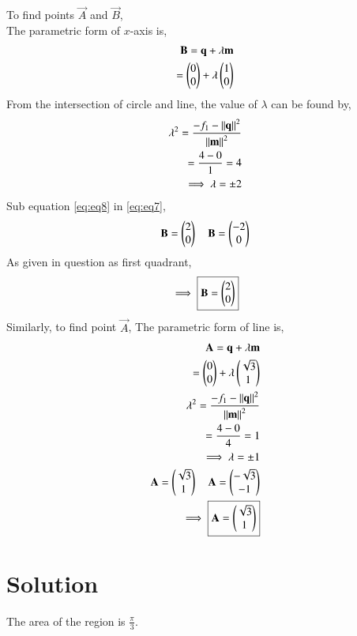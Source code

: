 \documentclass[journal,12pt,twocolumn]{IEEEtran}
\begin{document}
To find points $\vec{A}$ and $\vec{B}$,\\
The parametric form of $x$-axis is,
\begin{align}
    \mathbf{B} = \mathbf{q}+\lambda\mathbf{m}\\
=\begin{pmatrix}0\\0\end{pmatrix}+\lambda\begin{pmatrix}1\\0\end{pmatrix} \label{eq:eq7}
\end{align}
From the intersection of circle and line, the value of $\lambda$ can be found by,
\begin{align}
    \lambda^2 = \frac{-f_1-\left\lVert\mathbf{q}\right\rVert^2}{\left\lVert\mathbf{m}\right\rVert^2}\\
                = \frac{4-0}{1} = 4\\
    \implies \lambda = \pm{2} \label{eq:eq8}
\end{align}
Sub equation \eqref{eq:eq8} in \eqref{eq:eq7},
\begin{align}
    \mathbf{B} = \begin{pmatrix}2\\0\end{pmatrix}\quad \mathbf{B} = \begin{pmatrix}-2\\0\end{pmatrix} \label{eq:eq9}
\end{align}
As given in question as first quadrant,
\begin{align}
    \implies \boxed{\mathbf{B} = \begin{pmatrix}2\\0\end{pmatrix}} \label{eq:eq10}
\end{align}
Similarly, to find point $\vec{A}$,
The parametric form of line is,
\begin{align}
    \mathbf{A} = \mathbf{q}+\lambda\mathbf{m}\\
            = \begin{pmatrix}0\\0\end{pmatrix}+\lambda\begin{pmatrix}\sqrt{3}\\1\end{pmatrix}\\
    \lambda^2 = \frac{-f_1-\left\lVert\mathbf{q}\right\rVert^2}{\left\lVert\mathbf{m}\right\rVert^2}\\
                = \frac{4-0}{4} = 1\\
    \implies \lambda = \pm{1} \label{eq:eq11}\\
    \mathbf{A} = \begin{pmatrix}\sqrt{3}\\1\end{pmatrix}\quad \mathbf{A} = \begin{pmatrix}-\sqrt{3}\\-1\end{pmatrix}\label{eq:eq12}\\
\implies\boxed{\mathbf{A}=\begin{pmatrix}\sqrt{3}\\1\end{pmatrix}}
\end{align}
\section{Solution}
The area of the region is $\frac{\pi}{3}$.
\\
\end{document}
